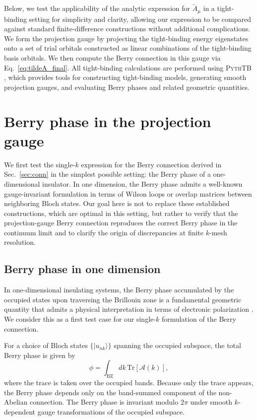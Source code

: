 \documentclass[galley,aps,pra,10pt,amsmath,amssymb,
    superscriptaddress,nofootinbib,longbibliography]{revtex4-2}
\begin{document}
Below, we test the applicability of the analytic expression for $\tilde{A}_\mu$ in a tight-binding setting for simplicity and clarity, allowing our expression to be compared against standard finite-difference constructions without additional complications. We form the projection gauge by projecting the tight-binding energy eigenstates onto a set of trial orbitals constructed as linear combinations of the tight-binding basis orbitals. We then compute the Berry connection in this gauge via Eq.~\ref{eq:tildeA_final}. All tight-binding calculations are performed using \textsc{PythTB} \cite{Cole_Python_Tight_Binding_2025, cole_2026_18727385}, which provides tools for constructing tight-binding models, generating smooth projection gauges, and evaluating Berry phases and related geometric quantities.

\section{Berry phase in the projection gauge}
\label{sec:berry_phase_proj}

We first test the single-$k$ expression for the Berry connection derived in Sec.~\ref{sec:conn} in the simplest possible setting: the Berry phase of a one-dimensional insulator. In one dimension, the Berry phase admits a well-known gauge-invariant formulation in terms of Wilson loops or overlap matrices between neighboring Bloch states. Our goal here is not to replace these established constructions, which are optimal in this setting, but rather to verify that the projection-gauge Berry connection reproduces the correct Berry phase in the continuum limit and to clarify the origin of discrepancies at finite $k$-mesh resolution.

\subsection{Berry phase in one dimension}

In one-dimensional insulating systems, the Berry phase accumulated by the occupied states upon traversing the Brillouin zone is a fundamental geometric quantity that admits a physical interpretation in terms of electronic polarization \cite{vanderbilt1993, resta1994}. We consider this as a first test case for our single-$k$ formulation of the Berry connection.

For a choice of Bloch states $\{|u_{n k}\rangle\}$ spanning the occupied subspace, the total Berry phase is given by
\begin{equation} 
\label{eq:berry_phase_1d}
\phi = \int_{\mathrm{BZ}} dk \, \text{Tr}\left[ \mathcal{A}(k) \right],
\end{equation}
where the trace is taken over the occupied bands. Because only the trace appears, the Berry phase depends only on the band-summed component of the non-Abelian connection. The Berry phase is invariant modulo $2\pi$ under smooth $k$-dependent gauge transformations of the occupied subspace.
\end{document}
